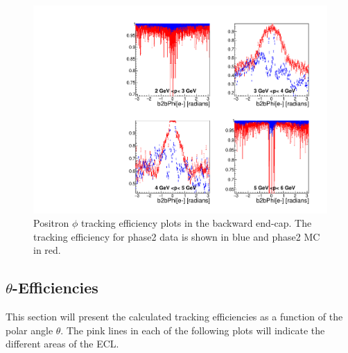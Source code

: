 \documentclass[a4paper,11pt,twosided,final,german,openbib,pdftex,listof=totoc,bibliography=totoc]{scrbook}
\begin{document}
\begin{figure}[!htbp]
	\centering
	\includegraphics[width=\textwidth]{Plots/master/xPMPhiepEC}
	\caption[Momentum $\phi$ Positron Backward End-Cap Efficiency Phase2]{Positron $\phi$ tracking efficiency plots in the backward end-cap. The tracking efficiency for phase2 data is shown in blue and phase2 MC in red.}
	
	\label{plt:xPMPhiepEC}
\end{figure}

\clearpage


\subsection{$\theta$-Efficiencies}

This section will present the calculated tracking efficiencies as a function of the polar angle $\theta$. The pink lines in each of the following plots will indicate the different areas of the ECL.
\end{document}
